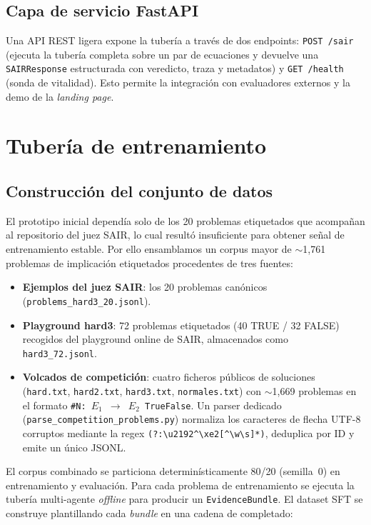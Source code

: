 \documentclass{article}
\begin{document}
\subsection{Capa de servicio FastAPI}

Una API REST ligera expone la tuber\'ia a trav\'es de dos endpoints: \texttt{POST /sair} (ejecuta la tuber\'ia completa sobre un par de ecuaciones y devuelve una \texttt{SAIRResponse} estructurada con veredicto, traza y metadatos) y \texttt{GET /health} (sonda de vitalidad). Esto permite la integraci\'on con evaluadores externos y la demo de la \textit{landing page}.

\section{Tuber\'ia de entrenamiento}
\label{sec:training}

\subsection{Construcci\'on del conjunto de datos}
\label{sec:dataset}

El prototipo inicial depend\'ia solo de los 20 problemas etiquetados que acompa\~nan al repositorio del juez SAIR, lo cual result\'o insuficiente para obtener se\~nal de entrenamiento estable. Por ello ensamblamos un corpus mayor de $\sim$1{,}761 problemas de implicaci\'on etiquetados procedentes de tres fuentes:
\begin{itemize}[itemsep=1pt]
  \item \textbf{Ejemplos del juez SAIR}: los 20 problemas can\'onicos (\texttt{problems\_hard3\_20.jsonl}).
  \item \textbf{Playground hard3}: 72 problemas etiquetados (40 TRUE / 32 FALSE) recogidos del playground online de SAIR, almacenados como \texttt{hard3\_72.jsonl}.
  \item \textbf{Volcados de competici\'on}: cuatro ficheros p\'ublicos de soluciones (\texttt{hard.txt}, \texttt{hard2.txt}, \texttt{hard3.txt}, \texttt{normales.txt}) con $\sim$1{,}669 problemas en el formato \texttt{\#N: $E_1$ $\rightarrow$ $E_2$ True\textbar{}False}. Un parser dedicado (\texttt{parse\_competition\_problems.py}) normaliza los caracteres de flecha UTF-8 corruptos mediante la regex \texttt{(?:\textbackslash u2192\textbar{}\^{}{\textbackslash xe2}[\^{}\textbackslash w\textbackslash s]*)}, deduplica por ID y emite un \'unico JSONL.
\end{itemize}
El corpus combinado se particiona determin\'isticamente 80/20 (semilla~0) en entrenamiento y evaluaci\'on. Para cada problema de entrenamiento se ejecuta la tuber\'ia multi-agente \textit{offline} para producir un \texttt{EvidenceBundle}. El dataset SFT se construye plantillando cada \textit{bundle} en una cadena de completado:
\end{document}
